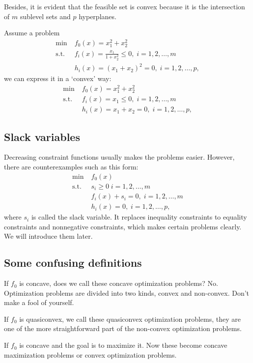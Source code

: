 \documentclass[lang=en,color=blue,mode=fancy,titlestyle=hang]{elegantbook}
\begin{document}
Besides, it is evident that the feasible set is convex because it is the intersection of
$m$ sublevel sets and $p$ hyperplanes.

Assume a problem
\begin{align*}
  \min \; &f_0(x) = x_1^2 + x_2^2 \\
  \text{s.t.} \; &f_i(x) = \frac{x_1}{1+x_2^2} \leq 0, \; i = 1, 2, \ldots, m \\
  &h_i(x) = {(x_1 + x_2)}^2 = 0, \; i = 1, 2, \ldots, p,
\end{align*}
we can express it in a `convex' way:
\begin{align*}
  \min \; &f_0(x) = x_1^2 + x_2^2 \\
  \text{s.t.} \; &f_i(x) = x_1 \leq 0, \; i = 1, 2, \ldots, m \\
  &h_i(x) = x_1 + x_2 = 0, \; i = 1, 2, \ldots, p,
\end{align*}

\subsection{Slack variables}
Decreasing constraint functions usually makes the problems easier. However, there are
counterexamples such as this form:
\begin{align*}
  \min \; &f_0(x) \\
  \text{s.t.} \; &s_i \geq 0 \; i = 1, 2, \ldots, m \\
  &f_i(x) + s_i = 0, \; i = 1, 2, \ldots, m \\
  &h_i(x) = 0, \; i = 1, 2, \ldots, p,
\end{align*}
where $s_i$ is called the slack variable. It replaces inequality constraints to equality
constraints and nonnegative constraints, which makes certain problems clearly. We will
introduce them later.

\subsection{Some confusing definitions}
If $f_0$ is concave, does we call these concave optimization problems? No. Optimization
problems are divided into two kinds, convex and non-convex. Don't make a fool of yourself.

If $f_0$ is quasiconvex, we call these quasiconvex optimization problems, they are
one of the more straightforward part of the non-convex optimization problems.

If $f_0$ is concave and the goal is to maximize it. Now these become concave maximization
problems or convex optimization problems.
\end{document}
